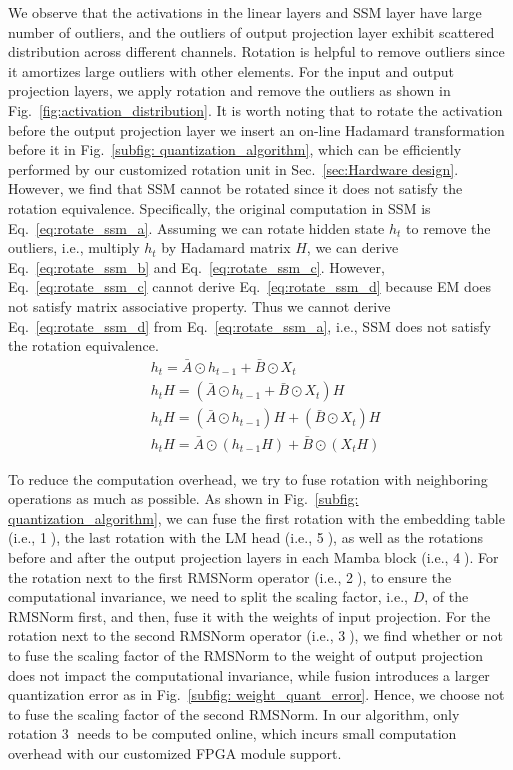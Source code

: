 We observe that the activations in the linear layers and SSM layer
have large number of outliers,
and the outliers of output projection layer exhibit scattered distribution
across different channels.
Rotation is helpful to remove outliers
since it amortizes large outliers with other elements.
For the input and output projection layers,
we apply rotation and remove the outliers as shown in Fig.~\ref{fig:activation_distribution}.
It is worth noting that
to rotate the activation before the output projection layer
we insert an on-line Hadamard transformation 
before it in Fig.~\ref{subfig: quantization_algorithm},
which can be efficiently performed by our customized
rotation unit in Sec.~\ref{sec:Hardware design}.
However, we find that SSM cannot be rotated since it
does not satisfy the rotation equivalence.
Specifically,
the original computation in SSM is Eq.~\ref{eq:rotate_ssm_a}.
Assuming we can rotate hidden state $h_t$ to remove the outliers,
i.e., multiply $h_t$ by Hadamard matrix $H$,
we can derive Eq.~\ref{eq:rotate_ssm_b} and Eq.~\ref{eq:rotate_ssm_c}.
However, Eq.~\ref{eq:rotate_ssm_c} cannot derive Eq.~\ref{eq:rotate_ssm_d}
because EM does not satisfy matrix associative property.
Thus we cannot derive Eq.~\ref{eq:rotate_ssm_d} from Eq.~\ref{eq:rotate_ssm_a}, i.e., SSM does not satisfy the rotation equivalence.
\begin{subequations}
\begin{align}
    & h_{t} = \bar{A} \odot h_{t-1}+\bar{B} \odot X_{t}  \label{eq:rotate_ssm_a}\\
    & h_{t}H = (\bar{A} \odot h_{t-1} + \bar{B} \odot X_{t})H \label{eq:rotate_ssm_b}\\
    & h_{t}H = (\bar{A} \odot h_{t-1})H + (\bar{B} \odot X_{t})H \label{eq:rotate_ssm_c}\\
    & h_{t}H = \bar{A} \odot (h_{t-1}H) + \bar{B} \odot (X_{t}H) \label{eq:rotate_ssm_d}
\end{align}
\end{subequations}

To reduce the computation overhead, we try to fuse rotation with neighboring operations as much
as possible. 
As shown in Fig.~\ref{subfig: quantization_algorithm}, we can fuse the first rotation
with the embedding table (i.e., \textcircled{1}),
the last rotation with the LM head (i.e., \textcircled{5}),
as well as the rotations before and after the output projection layers in each Mamba block (i.e., \textcircled{4}).
For the rotation next to the first RMSNorm operator (i.e., \textcircled{2}), to ensure
the computational invariance, we need to split the scaling factor, i.e., $D$, of the RMSNorm first,
and then, fuse it with the weights of input projection.
For the rotation next to the second RMSNorm operator (i.e., \textcircled{3}), we find whether
or not to fuse the scaling factor of the RMSNorm to the weight of output projection does not impact the computational invariance,
while fusion introduces a larger quantization error as in Fig.~\ref{subfig: weight_quant_error}. Hence, we choose not to fuse
the scaling factor of the second RMSNorm.
In our algorithm, only rotation \textcircled{3} needs to be computed online, which incurs small computation
overhead with our customized FPGA module support.

